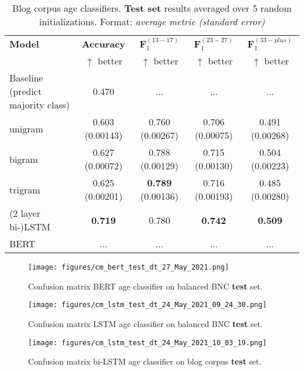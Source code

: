 \begin{table}[H]
    \centering
    \begin{tabular}{l c c c c}
    \hline
    \textbf{Model} & \textbf{Accuracy} & $\boldsymbol{F}_1^{(13-17)}$ & $\boldsymbol{F}_1^{(23-27)}$ & $\boldsymbol{F}_1^{(33-plus)}$\\
     & $\uparrow$ better & $\uparrow$ better & $\uparrow$ better & $\uparrow$ better\\
    \hline
    Baseline (predict majority class) & 0.470 & ... & ... & ...\\
    unigram & 0.603 (0.00143) & 0.760 (0.00267) & 0.706 (0.00075) & 0.491 (0.00268)\\
    bigram & 0.627 (0.00072) & 0.788 (0.00129) & 0.715 (0.00130) & 0.504 (0.00223)\\
    trigram & 0.625 (0.00201) & \textbf{0.789} (0.00136) & 0.716 (0.00193) & 0.485 (0.00280)\\
    (2 layer bi-)LSTM & \textbf{0.719} & 0.780 & \textbf{0.742} & \textbf{0.509}\\
    BERT & ... & ... & ... & ...\\
    \hline
    \end{tabular}
    \caption{Blog corpus age classifiers. \textbf{Test set} results averaged over 5 random initializations. Format: \textit{average metric (standard error)}}
    \label{tab:blog_classification}
\end{table}

\begin{figure}[H]
    \centering
    \texttt{[image: figures/cm\_bert\_test\_dt\_27\_May\_2021.png]}
    \caption{Confusion matrix BERT age classifier on balanced BNC \textbf{test} set.}
    \label{fig:cm_bert_bnc_rb}
\end{figure}

\begin{figure}[H]
    \centering
    \texttt{[image: figures/cm\_lstm\_test\_dt\_24\_May\_2021\_09\_24\_30.png]}
    \caption{Confusion matrix LSTM age classifier on balanced BNC \textbf{test} set.}
    \label{fig:cm_lstm_bnc_rb}
\end{figure}

\begin{figure}[H]
    \centering
    \texttt{[image: figures/cm\_lstm\_test\_dt\_24\_May\_2021\_10\_03\_19.png]}
    \caption{Confusion matrix bi-LSTM age classifier on blog corpus \textbf{test} set.}
    \label{fig:cm_lstm_blog}
\end{figure}

